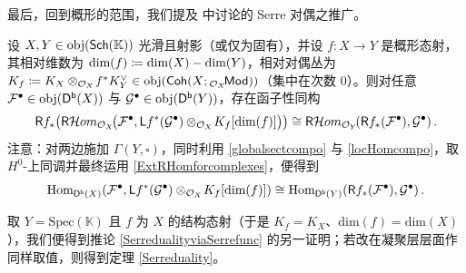 
最后，回到概形的范围，我们提及 \cite[第 3.4 节]{[Huy06]} 中讨论的 Serre 对偶之推广。

\begin{Thm}\label{GVduality}
	设 $X,Y\in\textup{obj}(\mathsf{Sch}(\mathbb{K}))$ 光滑且射影（或仅为固有），并设 $f:X\rightarrow Y$ 是概形态射，其\textup{相对维数}为 $\textup{dim}(f)\coloneqq\textup{dim}(X)-\textup{dim}(Y)$，\textup{相对对偶丛}为 $K_f\coloneqq K_X\otimes_{\mathcal{O}_X}\!f^*K_Y^\vee\in\textup{obj}(\mathsf{Coh}(X;{}_{\mathcal{O}_X}\!\mathsf{Mod}))$（集中在次数 0）。则对任意 $\mathcal{F}^\bullet\in\textup{obj}(\mathsf{D^b}(X))$ 与 $\mathcal{G}^\bullet\in\textup{obj}(\mathsf{D^b}(Y))$，存在函子性同构
	\begin{equation}
		\mathsf{R}f_*\big(\mathsf{R}\mathcal{H}om_{\mathcal{O}_X}\!\big(\mathcal{F}^\bullet,\mathsf{L}f^*(\mathcal{G}^\bullet)\otimes_{\mathcal{O}_X}\!K_f[\textup{dim}(f)]\big)\big)\cong\mathsf{R}\mathcal{H}om_{\mathcal{O}_Y}\!(\mathsf{R}f_*(\mathcal{F}^\bullet),\mathcal{G}^\bullet)\,.
	\end{equation}
	注意：对两边施加 $\Gamma(Y,\square)$，同时利用 \eqref{globalsectcompo} 与 \eqref{locHomcompo}，取 $H^0$-上同调并最终运用 \eqref{ExtRHomforcomplexes}，便得到
	\[
	\textup{Hom}_{\mathsf{D^b}(X)}(\mathcal{F}^\bullet,\mathsf{L}f^*(\mathcal{G}^\bullet)\otimes_{\mathcal{O}_X}\!K_f[\textup{dim}(f)])\cong \textup{Hom}_{\mathsf{D^b}(Y)}(\mathsf{R}f_*(\mathcal{F}^\bullet),\mathcal{G}^\bullet)\,.
	\]
\end{Thm}

取 $Y=\text{Spec}(\mathbb{K})$ 且 $f$ 为 $X$ 的结构态射（于是 $K_f=K_X$、$\text{dim}(f)=\text{dim}(X)$），我们便得到推论 \ref{SerredualityviaSerrefunc} 的另一证明；若改在凝聚层层面作同样取值，则得到定理 \ref{Serreduality}。


